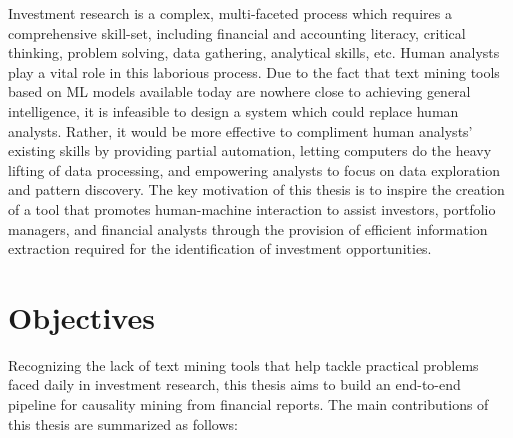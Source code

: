 

Investment research is a complex, multi-faceted process which requires a comprehensive skill-set, including financial and accounting literacy, critical thinking, problem solving, data gathering, analytical skills, etc. Human analysts play a vital role in this laborious process. Due to the fact that text mining tools based on ML models available today are nowhere close to achieving general intelligence, it is infeasible to design a system which could replace human analysts. Rather, it would be more effective to compliment human analysts' existing skills by providing partial automation, letting computers do the heavy lifting of data processing, and empowering analysts to focus on data exploration and pattern discovery. 
The key motivation of this thesis is to inspire the creation of a tool that promotes human-machine interaction to assist investors, portfolio managers, and financial analysts through the provision of efficient information extraction required for the identification of investment opportunities.


\section{Objectives}

Recognizing the lack of text mining tools that help tackle practical problems faced daily in investment research, this thesis aims to build an end-to-end pipeline for causality mining from financial reports. The main contributions of this thesis are summarized as follows:

